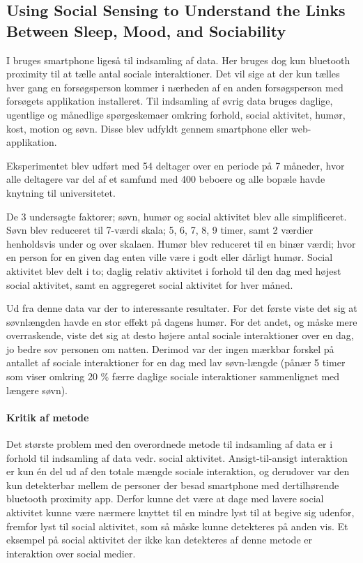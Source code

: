 \subsection{Using Social Sensing to Understand the Links Between Sleep, Mood, and Sociability}
I \citet{social_sensing_2} bruges smartphone ligeså til indsamling af data.
Her bruges dog kun bluetooth proximity til at tælle antal sociale interaktioner.
Det vil sige at der kun tælles hver gang en forsøgsperson kommer i nærheden af en anden forsøgsperson med forsøgets applikation installeret.
Til indsamling af øvrig data bruges daglige, ugentlige og månedlige spørgeskemaer omkring forhold, social aktivitet, humør, kost, motion og søvn.
Disse blev udfyldt gennem smartphone eller web-applikation.

Eksperimentet blev udført med 54 deltager over en periode på 7 måneder, hvor alle deltagere var del af et samfund med 400 beboere og alle bopæle havde knytning til universitetet.

De 3 undersøgte faktorer; søvn, humør og social aktivitet blev alle simplificeret.
Søvn blev reduceret til 7-værdi skala; 5, 6, 7, 8, 9 timer, samt 2 værdier henholdsvis under og over skalaen.
Humør blev reduceret til en binær værdi; hvor en person for en given dag enten ville være i godt eller dårligt humør.
Social aktivitet blev delt i to; daglig relativ aktivitet i forhold til den dag med højest social aktivitet, samt en aggregeret social aktivitet for hver måned.

Ud fra denne data var der to interessante resultater.
For det første viste det sig at søvnlængden havde en stor effekt på dagens humør.
For det andet, og måske mere overraskende, viste det sig at desto højere antal sociale interaktioner over en dag, jo bedre sov personen om natten.
Derimod var der ingen mærkbar forskel på antallet af sociale interaktioner for en dag med lav søvn-længde (pånær 5 timer som viser omkring 20 \% færre daglige sociale interaktioner sammenlignet med længere søvn).

\paragraph{Kritik af metode}
Det største problem med den overordnede metode til indsamling af data er i forhold til indsamling af data vedr. social aktivitet.
Ansigt-til-ansigt interaktion er kun én del ud af den totale mængde sociale interaktion, og derudover var den kun detekterbar mellem de personer der besad smartphone med dertilhørende bluetooth proximity app.
Derfor kunne det være at dage med lavere social aktivitet kunne være nærmere knyttet til en mindre lyst til at begive sig udenfor, fremfor lyst til social aktivitet, som så måske kunne detekteres på anden vis.
Et eksempel på social aktivitet der ikke kan detekteres af denne metode er interaktion over social medier.

